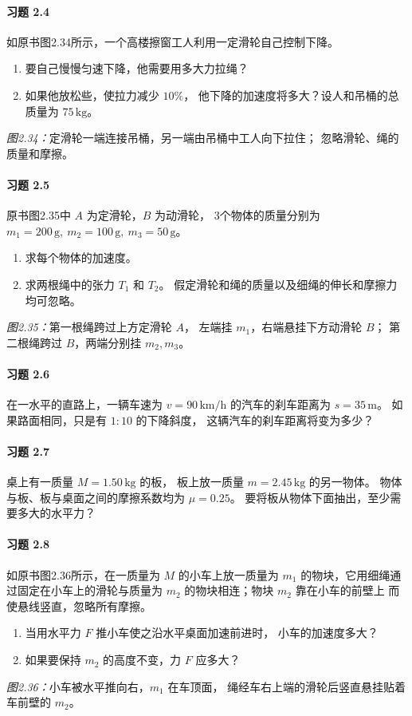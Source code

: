 \paragraph{习题 2.4}
如原书图2.34所示，一个高楼擦窗工人利用一定滑轮自己控制下降。
\begin{enumerate}
\item 要自己慢慢匀速下降，他需要用多大力拉绳？
\item 如果他放松些，使拉力减少 \(10\%\)，
他下降的加速度将多大？设人和吊桶的总质量为 \(75\,\mathrm{kg}\)。
\end{enumerate}
\textit{图2.34：}定滑轮一端连接吊桶，另一端由吊桶中工人向下拉住；
忽略滑轮、绳的质量和摩擦。

\paragraph{习题 2.5}
原书图2.35中 \(A\) 为定滑轮，\(B\) 为动滑轮，
3个物体的质量分别为
\(m_1=200\,\mathrm g,\ m_2=100\,\mathrm g,\
m_3=50\,\mathrm g\)。
\begin{enumerate}
\item 求每个物体的加速度。
\item 求两根绳中的张力 \(T_1\) 和 \(T_2\)。
假定滑轮和绳的质量以及细绳的伸长和摩擦力均可忽略。
\end{enumerate}
\textit{图2.35：}第一根绳跨过上方定滑轮 \(A\)，
左端挂 \(m_1\)，右端悬挂下方动滑轮 \(B\)；
第二根绳跨过 \(B\)，两端分别挂 \(m_2,m_3\)。

\paragraph{习题 2.6}
在一水平的直路上，一辆车速为
\(v=90\,\mathrm{km/h}\) 的汽车的刹车距离为
\(s=35\,\mathrm m\)。
如果路面相同，只是有 \(1:10\) 的下降斜度，
这辆汽车的刹车距离将变为多少？

\paragraph{习题 2.7}
桌上有一质量 \(M=1.50\,\mathrm{kg}\) 的板，
板上放一质量 \(m=2.45\,\mathrm{kg}\) 的另一物体。
物体与板、板与桌面之间的摩擦系数均为 \(\mu=0.25\)。
要将板从物体下面抽出，至少需要多大的水平力？

\paragraph{习题 2.8}
如原书图2.36所示，在一质量为 \(M\) 的小车上放一质量为
\(m_1\) 的物块，它用细绳通过固定在小车上的滑轮与质量为
\(m_2\) 的物块相连；物块 \(m_2\) 靠在小车的前壁上
而使悬线竖直，忽略所有摩擦。
\begin{enumerate}
\item 当用水平力 \(F\) 推小车使之沿水平桌面加速前进时，
小车的加速度多大？
\item 如果要保持 \(m_2\) 的高度不变，力 \(F\) 应多大？
\end{enumerate}
\textit{图2.36：}小车被水平推向右，\(m_1\) 在车顶面，
绳经车右上端的滑轮后竖直悬挂贴着车前壁的 \(m_2\)。

